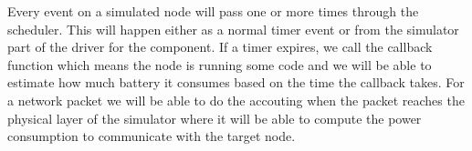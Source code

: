 Every event on a simulated node will pass one or more times through the
scheduler. This will happen either as a normal timer event or from the simulator
part of the driver for the component. If a timer expires, we call the callback
function which means the node is running some code and we will be able to
estimate how much battery it consumes based on the time the callback takes.
For a network packet we will be able to do the accouting when the packet
reaches the physical layer of the simulator where it will be able to compute
the power consumption to communicate with the target node.
